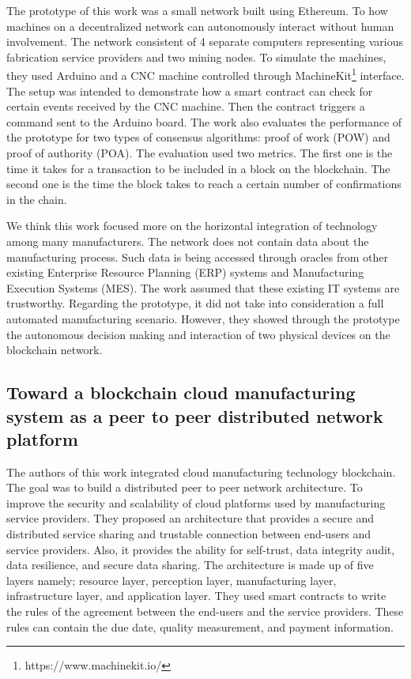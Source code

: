 \documentclass[runningheads]{llncs}
\begin{document}
\noindent
The prototype of this work was a small network built using Ethereum. To how machines on a decentralized network can autonomously interact without human involvement. The network consistent of 4 separate computers representing various fabrication service providers and two mining nodes. To simulate the machines, they used Arduino and a CNC machine controlled through MachineKit\footnote{https://www.machinekit.io/} interface. The setup was intended to demonstrate how a smart contract can check for certain events received by the CNC machine. Then the contract triggers a command sent to the Arduino board. The work also evaluates the performance of the prototype for two types of consensus algorithms: proof of work (POW) and proof of authority (POA). The evaluation used two metrics. The first one is the time it takes for a transaction to be included in a block on the blockchain. The second one is the time the block takes to reach a certain number of confirmations in the chain.
\bigbreak

\noindent
We think this work focused more on the horizontal integration of technology among many manufacturers.  The network does not contain data about the manufacturing process. Such data is being accessed through oracles from other existing Enterprise Resource Planning (ERP) systems and Manufacturing Execution Systems (MES). The work assumed that these existing IT systems are trustworthy. Regarding the prototype, it did not take into consideration a full automated manufacturing scenario. However, they showed through the prototype the autonomous decision making and interaction of two physical devices on the blockchain network.  

\subsection{Toward a blockchain cloud manufacturing system as a peer to peer distributed network platform\cite{Li2018}}


The authors of this work integrated cloud manufacturing technology blockchain. The goal was to build a distributed peer to peer network architecture. To improve the security and scalability of cloud platforms used by manufacturing service providers. They proposed an architecture that provides a secure and distributed service sharing and trustable connection between end-users and service providers. Also, it provides the ability for self-trust, data integrity audit, data resilience, and secure data sharing. The architecture is made up of five layers namely; resource layer, perception layer, manufacturing layer, infrastructure layer, and application layer. They used smart contracts to write the rules of the agreement between the end-users and the service providers. These rules can contain the due date, quality measurement, and payment information.
\bigbreak
\end{document}
